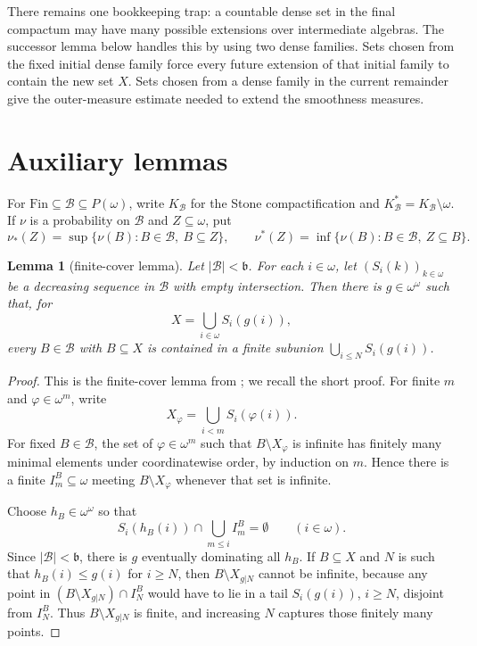 \documentclass[11pt]{amsart}
\newtheorem{lemma}[theorem]{Lemma}
\theoremstyle{definition}
\newcommand{\B}{\mathcal B}
\newcommand{\Fin}{\mathrm{Fin}}
\newcommand{\bb}{\mathfrak b}
\begin{document}
There remains one bookkeeping trap: a countable dense set in the final compactum
may have many possible extensions over intermediate algebras.  The successor
lemma below handles this by using two dense families.  Sets chosen from the
fixed initial dense family force every future extension of that initial family
to contain the new set \(X\).  Sets chosen from a dense family in the current
remainder give the outer-measure estimate needed to extend the smoothness
measures.

\section*{Auxiliary lemmas}

For \(\Fin\subseteq\B\subseteq P(\omega)\), write \(K_\B\) for the Stone
compactification and \(K_\B^*=K_\B\setminus\omega\).  If \(\nu\) is a
probability on \(\B\) and \(Z\subseteq\omega\), put
\[
        \nu_*(Z)=\sup\{\nu(B):B\in\B,\ B\subseteq Z\},\qquad
        \nu^*(Z)=\inf\{\nu(B):B\in\B,\ Z\subseteq B\}.
\]

\begin{lemma}[finite-cover lemma]\label{lem:finite-cover}
Let \(|\B|<\bb\).  For each \(i\in\omega\), let
\((S_i(k))_{k\in\omega}\) be a decreasing sequence in \(\B\) with empty
intersection.  Then there is \(g\in\omega^\omega\) such that, for
\[
        X=\bigcup_{i\in\omega}S_i(g(i)),
\]
every \(B\in\B\) with \(B\subseteq X\) is contained in a finite subunion
\(\bigcup_{i\le N}S_i(g(i))\).
\end{lemma}

\begin{proof}
This is the finite-cover lemma from \cite{DP2015}; we recall the short proof.
For finite \(m\) and \(\varphi\in\omega^m\), write
\[
        X_\varphi=\bigcup_{i<m}S_i(\varphi(i)).
\]
For fixed \(B\in\B\), the set of \(\varphi\in\omega^m\) such that
\(B\setminus X_\varphi\) is infinite has finitely many minimal elements under
coordinatewise order, by induction on \(m\).  Hence there is a finite
\(I_m^B\subseteq\omega\) meeting \(B\setminus X_\varphi\) whenever that set is
infinite.

Choose \(h_B\in\omega^\omega\) so that
\[
        S_i(h_B(i))\cap\bigcup_{m\le i}I_m^B=\emptyset
        \qquad(i\in\omega).
\]
Since \(|\B|<\bb\), there is \(g\) eventually dominating all \(h_B\).  If
\(B\subseteq X\) and \(N\) is such that \(h_B(i)\le g(i)\) for \(i\ge N\), then
\(B\setminus X_{g|N}\) cannot be infinite, because any point in
\((B\setminus X_{g|N})\cap I_N^B\) would have to lie in a tail
\(S_i(g(i))\), \(i\ge N\), disjoint from \(I_N^B\).  Thus
\(B\setminus X_{g|N}\) is finite, and increasing \(N\) captures those finitely
many points.
\end{proof}
\end{document}

